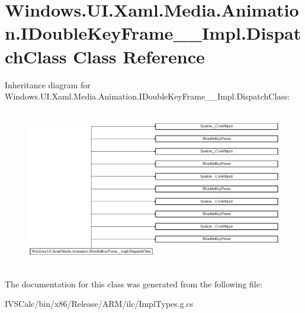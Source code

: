 \hypertarget{class_windows_1_1_u_i_1_1_xaml_1_1_media_1_1_animation_1_1_i_double_key_frame_____impl_1_1_dispatch_class}{}\section{Windows.\+U\+I.\+Xaml.\+Media.\+Animation.\+I\+Double\+Key\+Frame\+\_\+\+\_\+\+Impl.\+Dispatch\+Class Class Reference}
\label{class_windows_1_1_u_i_1_1_xaml_1_1_media_1_1_animation_1_1_i_double_key_frame_____impl_1_1_dispatch_class}
Inheritance diagram for Windows.\+U\+I.\+Xaml.\+Media.\+Animation.\+I\+Double\+Key\+Frame\+\_\+\+\_\+\+Impl.\+Dispatch\+Class\+:\begin{figure}[H]
\begin{center}
\leavevmode
\includegraphics[height=7.000000cm]{class_windows_1_1_u_i_1_1_xaml_1_1_media_1_1_animation_1_1_i_double_key_frame_____impl_1_1_dispatch_class}
\end{center}
\end{figure}


The documentation for this class was generated from the following file\+:\begin{DoxyCompactItemize}
\item 
I\+V\+S\+Calc/bin/x86/\+Release/\+A\+R\+M/ilc/Impl\+Types.\+g.\+cs\end{DoxyCompactItemize}
